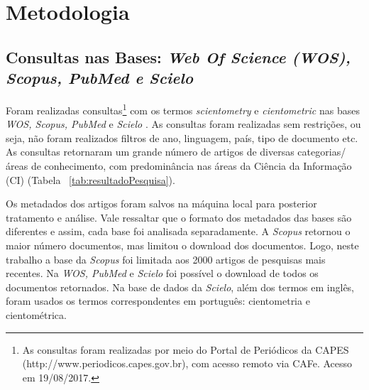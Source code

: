 \documentclass[
	article,			%
	11pt,				%
	oneside,			%
	a4paper,			%
	english,			%
	brazil,				%
	sumario=tradicional
	]{abntex2}
\begin{document}
\section{Metodologia}


\subsection{Consultas nas Bases: \emph{Web Of Science (WOS), Scopus, PubMed e Scielo}}

Foram realizadas consultas\footnote{As consultas foram realizadas por meio do Portal de Periódicos da CAPES (http://www.periodicos.capes.gov.br), com acesso remoto via CAFe. Acesso em 19/08/2017.} com os termos \emph{scientometry} e \emph{cientometric} nas bases \emph{WOS, Scopus, PubMed} e \emph{Scielo} . As consultas foram realizadas sem restrições, ou seja, não foram realizados filtros de ano, linguagem, país, tipo de documento etc. As consultas retornaram um grande número de artigos de diversas categorias/áreas de conhecimento, com predominância nas áreas da Ciência da Informação (CI) (Tabela ~\ref{tab:resultadoPesquisa}).

Os metadados dos artigos foram salvos na máquina local para posterior tratamento e análise. Vale ressaltar que o formato dos metadados das bases são diferentes e assim, cada base foi analisada separadamente. A \emph{Scopus} retornou o maior número documentos, mas limitou o download dos documentos. Logo, neste trabalho a base da \emph{Scopus} foi limitada aos 2000 artigos de pesquisas mais recentes. Na \emph{WOS, PubMed} e \emph{Scielo} foi possível o download de todos os documentos retornados. Na base de dados da \emph{Scielo}, além dos termos em inglês, foram usados os termos correspondentes em português: cientometria e cientométrica.
\end{document}

